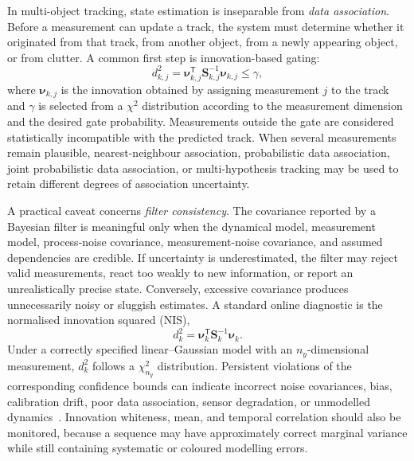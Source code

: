 \documentclass[graybox,envcountchap]{style/SNmono}
\begin{document}
In multi-object tracking, state estimation is inseparable from
\emph{data association}. Before a measurement can update a track, the
system must determine whether it originated from that track, from
another object, from a newly appearing object, or from clutter. A common
first step is innovation-based gating:
\begin{equation}
d_{k,j}^{2}
=
\boldsymbol{\nu}_{k,j}^{\mathsf T}
\mathbf{S}_{k,j}^{-1}
\boldsymbol{\nu}_{k,j}
\leq \gamma,
\label{eq:mahalanobis_gate}
\end{equation}
where $\boldsymbol{\nu}_{k,j}$ is the innovation obtained by assigning
measurement $j$ to the track and $\gamma$ is selected from a
$\chi^2$ distribution according to the measurement dimension and the
desired gate probability. Measurements outside the gate are considered
statistically incompatible with the predicted track. When several
measurements remain plausible, nearest-neighbour association,
probabilistic data association, joint probabilistic data association,
or multi-hypothesis tracking may be used to retain different degrees of
association uncertainty.





A practical caveat concerns \emph{filter consistency}. The covariance
reported by a Bayesian filter is meaningful only when the dynamical
model, measurement model, process-noise covariance, measurement-noise
covariance, and assumed dependencies are credible. If uncertainty is
underestimated, the filter may reject valid measurements, react too
weakly to new information, or report an unrealistically precise state.
Conversely, excessive covariance produces unnecessarily noisy or
sluggish estimates. A standard online diagnostic is the normalised
innovation squared (NIS),
\begin{equation}
d^2_k
=
\boldsymbol{\nu}_k^{\mathsf T}
\mathbf{S}_k^{-1}
\boldsymbol{\nu}_k.
\label{eq:nis}
\end{equation}
Under a correctly specified linear--Gaussian model with an
$n_y$-dimensional measurement, $d^2_k$ follows a
$\chi^2_{n_y}$ distribution. Persistent violations of the corresponding
confidence bounds can indicate incorrect noise covariances, bias,
calibration drift, poor data association, sensor degradation, or
unmodelled dynamics~\cite{barshalom2001_estimation}. Innovation
whiteness, mean, and temporal correlation should also be monitored,
because a sequence may have approximately correct marginal variance
while still containing systematic or coloured modelling errors.
\end{document}
